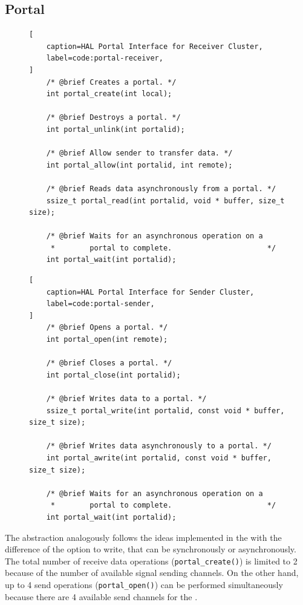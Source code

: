 	\subsection{Portal}

\begin{figure}[t]
\begin{lstlisting}[
	caption=HAL Portal Interface for Receiver Cluster,
	label=code:portal-receiver,
]
	/* @brief Creates a portal. */
	int portal_create(int local);

	/* @brief Destroys a portal. */
	int portal_unlink(int portalid);

	/* @brief Allow sender to transfer data. */
	int portal_allow(int portalid, int remote);

	/* @brief Reads data asynchronously from a portal. */
	ssize_t portal_read(int portalid, void * buffer, size_t size);

	/* @brief Waits for an asynchronous operation on a
	 *        portal to complete.                      */
	int portal_wait(int portalid);
\end{lstlisting}
\end{figure}

\begin{figure}[t]
\begin{lstlisting}[
	caption=HAL Portal Interface for Sender Cluster,
	label=code:portal-sender,
]
	/* @brief Opens a portal. */
	int portal_open(int remote);

	/* @brief Closes a portal. */
	int portal_close(int portalid);

	/* @brief Writes data to a portal. */
	ssize_t portal_write(int portalid, const void * buffer, size_t size);

	/* @brief Writes data asynchronously to a portal. */
	int portal_awrite(int portalid, const void * buffer, size_t size);

	/* @brief Waits for an asynchronous operation on a
	 *        portal to complete.                      */
	int portal_wait(int portalid);
\end{lstlisting}
\end{figure}

		The \portal abstraction analogously follows the ideas implemented
		in the \mailbox with the difference of the option to write,
		that can be synchronously or asynchronously.
		The total number of receive data operations (\texttt{portal\_create()})
		is limited to 2 because of the number of available signal sending channels.
		On the other hand, up to 4 send operations (\texttt{portal\_open()})
		can be performed simultaneously because there are 4 available send
		channels for the \portal.


